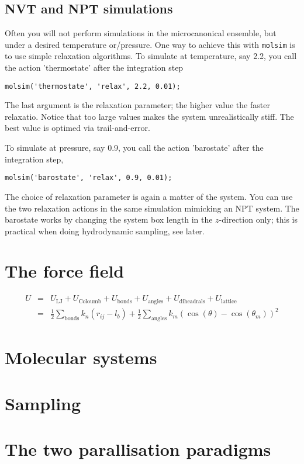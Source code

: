 \documentclass[11pt]{article}
\begin{document}
\subsection{NVT and NPT simulations}
Often you will not perform simulations in the microcanonical ensemble, but under
a desired temperature or/pressure. One way to achieve this with \verb!molsim! is
to use simple relaxation algorithms. To simulate at temperature, say 2.2, you
call the action 'thermostate' after the integration step
\begin{verbatim}
molsim('thermostate', 'relax', 2.2, 0.01);
\end{verbatim}
The last argument is the relaxation parameter; the higher value the faster
relaxatio. Notice that too large values makes the system unrealistically
stiff. The best value is optimed via trail-and-error.

To simulate at pressure, say 0.9, you call the action 'barostate' after the
integration step,
\begin{verbatim}
molsim('barostate', 'relax', 0.9, 0.01);
\end{verbatim}
The choice of relaxation parameter is again a matter of the system. You can use
the two relaxation actions in the same simulation mimicking an NPT system. The
barostate works by changing the system box length in the $z$-direction only;
this is practical when doing hydrodynamic sampling, see later. 

\section{The force field}
\begin{eqnarray}
  U &=& U_\mathrm{LJ} + U_{\mathrm{Coloumb}} + U_\mathrm{bonds} + U_\mathrm{angles} +
        U_\mathrm{diheadrals} + U_\mathrm{lattice} \\
    &=& \frac{1}{2}\sum_{\mathrm{bonds}} k_n(r_{ij} - l_b) +
        \frac{1}{2}\sum_{\mathrm{angles}} k_m (\cos(\theta) - \cos(\theta_m))^2
\end{eqnarray}

\section{Molecular systems}
\section{Sampling}
\section{The two parallisation paradigms}
\end{document}
